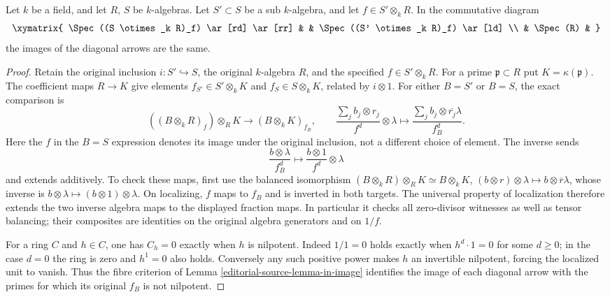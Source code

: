 \begin{lemma}
\label{editorial-source-lemma-same-image}
Let $k$ be a field, and let $R$, $S$ be $k$-algebras.
Let $S' \subset S$ be a sub $k$-algebra, and let $f \in S' \otimes_k R$.
In the commutative diagram
$$
\xymatrix{
\Spec((S \otimes_k R)_f) \ar[rd] \ar[rr] & &
\Spec((S' \otimes_k R)_f) \ar[ld] \\
& \Spec(R) &
}
$$
the images of the diagonal arrows are the same.
\end{lemma}

\begin{proof}
Retain the original inclusion $i:S'\hookrightarrow S$,
the original $k$-algebra $R$, and the specified
$f\in S'\otimes_kR$. For a prime $\mathfrak p\subset R$
put $K=\kappa(\mathfrak p)$. The coefficient maps
$R\to K$ give elements $f_{S'}\in S'\otimes_kK$
and $f_S\in S\otimes_kK$, related by $i\otimes1$.
For either $B=S'$ or $B=S$, the exact comparison is
$$
((B\otimes_kR)_f)\otimes_RK
\longrightarrow (B\otimes_kK)_{f_B},
\qquad
\frac{\sum_j b_j\otimes r_j}{f^d}\otimes\lambda
\longmapsto
\frac{\sum_j b_j\otimes\overline{r_j}\lambda}{f_B^d}.
$$
Here the $f$ in the $B=S$ expression denotes its
image under the original inclusion, not a different
choice of element. The inverse sends
$$
\frac{b\otimes\lambda}{f_B^d}
\longmapsto \frac{b\otimes1}{f^d}\otimes\lambda
$$
and extends additively. To check these maps, first use
the balanced isomorphism
$(B\otimes_kR)\otimes_RK\simeq B\otimes_kK$,
$(b\otimes r)\otimes\lambda\mapsto b\otimes\overline r\lambda$,
whose inverse is $b\otimes\lambda\mapsto(b\otimes1)\otimes\lambda$.
On localizing, $f$ maps to $f_B$ and is inverted in
both targets. The universal property of localization
therefore extends the two inverse algebra maps to
the displayed fraction maps. In particular it checks
all zero-divisor witnesses as well as tensor balancing;
their composites are identities on the original
algebra generators and on $1/f$.

For a ring $C$ and $h\in C$, one has $C_h=0$
exactly when $h$ is nilpotent. Indeed $1/1=0$
holds exactly when $h^d\cdot1=0$ for some
$d\geq0$; in the case $d=0$ the ring is zero
and $h^1=0$ also holds. Conversely any such positive
power makes $h$ an invertible nilpotent, forcing the
localized unit to vanish. Thus the fibre criterion
of Lemma \ref{editorial-source-lemma-in-image} identifies the image
of each diagonal arrow with the primes for which
its original $f_B$ is not nilpotent.


\end{proof}
